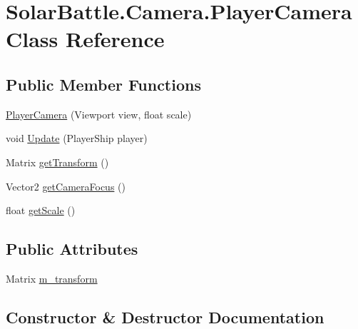 \hypertarget{class_solar_battle_1_1_camera_1_1_player_camera}{}\section{Solar\+Battle.\+Camera.\+Player\+Camera Class Reference}
\label{class_solar_battle_1_1_camera_1_1_player_camera}
\subsection*{Public Member Functions}
\begin{DoxyCompactItemize}
\item 
\mbox{\hyperlink{class_solar_battle_1_1_camera_1_1_player_camera_ab617c8888645482072dc9b983d8a5d6e}{Player\+Camera}} (Viewport view, float scale)
\item 
void \mbox{\hyperlink{class_solar_battle_1_1_camera_1_1_player_camera_ab2ba554b5610da18c104238f3529d074}{Update}} (Player\+Ship player)
\item 
Matrix \mbox{\hyperlink{class_solar_battle_1_1_camera_1_1_player_camera_a13bd90207a9d212b549871dc790849dc}{get\+Transform}} ()
\item 
Vector2 \mbox{\hyperlink{class_solar_battle_1_1_camera_1_1_player_camera_af3a0cf6ebdedd4932b8961f457fd279e}{get\+Camera\+Focus}} ()
\item 
float \mbox{\hyperlink{class_solar_battle_1_1_camera_1_1_player_camera_a1667a5cd6cbf37f2f0b9121b57476d52}{get\+Scale}} ()
\end{DoxyCompactItemize}
\subsection*{Public Attributes}
\begin{DoxyCompactItemize}
\item 
Matrix \mbox{\hyperlink{class_solar_battle_1_1_camera_1_1_player_camera_a6a863da393627c0df6176e4b69b9b106}{m\+\_\+transform}}
\end{DoxyCompactItemize}


\subsection{Constructor \& Destructor Documentation}
\mbox{\label{class_solar_battle_1_1_camera_1_1_player_camera_ab617c8888645482072dc9b983d8a5d6e}} 
